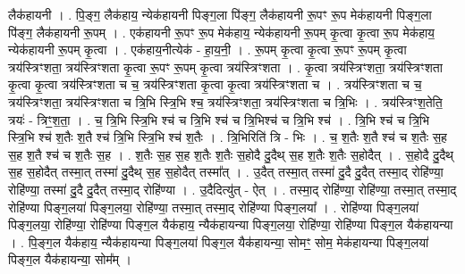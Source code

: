 \documentclass[17pt]{extarticle}
\begin{document}
लैक॑हायनी । . पि॒ङ्ग॒ लैक॑हाय॒ न्येक॑हायनी पिङ्ग॒ला पि॑ङ्ग॒ लैक॑हायनी रू॒पꣳ रू॒प मेक॑हायनी पिङ्ग॒ला पि॑ङ्ग॒
लैक॑हायनी रू॒पम् । . एक॑हायनी रू॒पꣳ रू॒प मेक॑हाय॒ न्येक॑हायनी रू॒पम् कृ॒त्वा कृ॒त्वा रू॒प मेक॑हाय॒ न्येक॑हायनी रू॒पम् कृ॒त्वा । . एक॑हाय॒नीत्येक॑ - हा॒य॒नी॒ । . रू॒पम् कृ॒त्वा कृ॒त्वा रू॒पꣳ रू॒पम् कृ॒त्वा त्रय॑स्त्रिꣳशता॒ त्रय॑स्त्रिꣳशता कृ॒त्वा रू॒पꣳ रू॒पम् कृ॒त्वा त्रय॑स्त्रिꣳशता । . कृ॒त्वा त्रय॑स्त्रिꣳशता॒ त्रय॑स्त्रिꣳशता कृ॒त्वा कृ॒त्वा त्रय॑स्त्रिꣳशता च च॒ त्रय॑स्त्रिꣳशता कृ॒त्वा कृ॒त्वा त्रय॑स्त्रिꣳशता च । . त्रय॑स्त्रिꣳशता च च॒ त्रय॑स्त्रिꣳशता॒ त्रय॑स्त्रिꣳशता च त्रि॒भि स्त्रि॒भि श्च॒ त्रय॑स्त्रिꣳशता॒ त्रय॑स्त्रिꣳशता च त्रि॒भिः । . त्रय॑स्त्रिꣳश॒तेति॒ त्रयः॑ - त्रिꣳ॒॒श॒ता॒ । . च॒ त्रि॒भि स्त्रि॒भि श्च॑ च त्रि॒भि श्च॑ च त्रि॒भिश्च॑ च त्रि॒भि श्च॑ । . त्रि॒भि श्च॑ च त्रि॒भि स्त्रि॒भि श्च॑ श॒तैः श॒तै श्च॑ त्रि॒भि स्त्रि॒भि श्च॑ श॒तैः । . त्रि॒भिरिति॑ त्रि - भिः । . च॒ श॒तैः श॒तै श्च॑ च श॒तैः स॒ह स॒ह श॒तै श्च॑ च श॒तैः स॒ह । . श॒तैः स॒ह स॒ह श॒तैः श॒तैः स॒होदै दु॒दैथ् स॒ह श॒तैः श॒तैः स॒होदैत् । . स॒होदै दु॒दैथ् स॒ह स॒होदैत् तस्मा॒त् तस्मा॑ दु॒दैथ् स॒ह स॒होदैत् तस्मा᳚त् । . उ॒दैत् तस्मा॒त् तस्मा॑ दु॒दै दु॒दैत् तस्मा॒द् रोहि॑ण्या॒ रोहि॑ण्या॒ तस्मा॑ दु॒दै दु॒दैत् तस्मा॒द् रोहि॑ण्या । . उ॒दैदित्यु॑त् - ऐत् । . तस्मा॒द् रोहि॑ण्या॒ रोहि॑ण्या॒ तस्मा॒त् तस्मा॒द् रोहि॑ण्या पिङ्ग॒लया॑ पिङ्ग॒लया॒ रोहि॑ण्या॒ तस्मा॒त् तस्मा॒द् रोहि॑ण्या पिङ्ग॒लया᳚ । . रोहि॑ण्या पिङ्ग॒लया॑ पिङ्ग॒लया॒ रोहि॑ण्या॒ रोहि॑ण्या पिङ्ग॒ल यैक॑हाय॒ न्यैक॑हायन्या पिङ्ग॒लया॒ रोहि॑ण्या॒ रोहि॑ण्या पिङ्ग॒ल यैक॑हायन्या । . पि॒ङ्ग॒ल यैक॑हाय॒ न्यैक॑हायन्या पिङ्ग॒लया॑ पिङ्ग॒ल यैक॑हायन्या॒ सोमꣳ॒॒ सोम॒ मेक॑हायन्या पिङ्ग॒लया॑ पिङ्ग॒ल यैक॑हायन्या॒ सोम᳚म् । \newline
\end{document}
